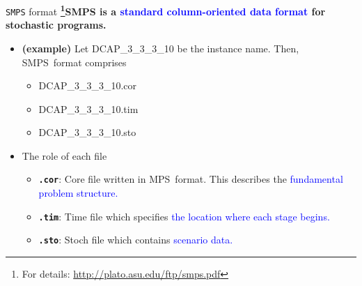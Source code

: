 \documentclass[usenames,dvipsnames]{beamer}
\newcommand{\smps}{\textsf{SMPS}}
\newcommand{\mps}{\textsf{MPS}}
\begin{document}
\begin{frame}{\texttt{SMPS} format}
\textbf{\footnote{\tiny For details: \href{http://plato.asu.edu/ftp/smps.pdf}{http://plato.asu.edu/ftp/smps.pdf}}{\smps} is a \textcolor{blue}{standard column-oriented data format} for stochastic programs.} 
\begin{itemize}
\item \textbf{(example)} Let DCAP\_3\_3\_3\_10 be the instance name. Then, \smps\ format comprises
\begin{itemize}
\item DCAP\_3\_3\_3\_10.cor
\item DCAP\_3\_3\_3\_10.tim
\item DCAP\_3\_3\_3\_10.sto
\end{itemize}
\item The role of each file
\begin{itemize}
\item \textbf{\texttt{.cor}}: Core file written in \mps\ format. This describes the \textcolor{blue}{fundamental problem structure.}
\item \textbf{\texttt{.tim}}: Time file which specifies \textcolor{blue}{the location where each stage begins.}
\item \textbf{\texttt{.sto}}: Stoch file which contains \textcolor{blue}{scenario data.}
\end{itemize}
\end{itemize}
\end{frame}
\end{document}
